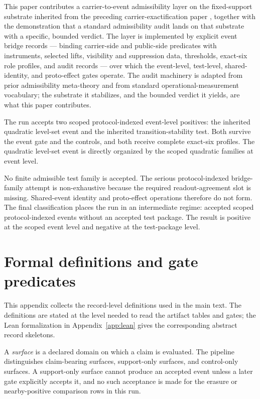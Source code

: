 \documentclass[11pt]{article}
\theoremstyle{definition}
\begin{document}
This paper contributes a carrier-to-event admissibility layer on the fixed-support substrate inherited from the preceding carrier-exactification paper \citep{Tsiokos2026CarrierExactification}, together with the demonstration that a standard admissibility audit lands on that substrate with a specific, bounded verdict. The layer is implemented by explicit event bridge records — binding carrier-side and public-side predicates with instruments, selected lifts, visibility and suppression data, thresholds, exact-six role profiles, and audit records — over which the event-level, test-level, shared-identity, and proto-effect gates operate. The audit machinery is adapted from prior admissibility meta-theory \citep{Tsiokos2026FoundationsII} and from standard operational-measurement vocabulary; the substrate it stabilizes, and the bounded verdict it yields, are what this paper contributes.

The run accepts two scoped protocol-indexed event-level positives: the inherited quadratic level-set event and the inherited transition-stability test. Both survive the event gate and the controls, and both receive complete exact-six profiles. The quadratic level-set event is directly organized by the scoped quadratic families at event level.

No finite admissible test family is accepted. The serious protocol-indexed bridge-family attempt is non-exhaustive because the required readout-agreement slot is missing. Shared-event identity and proto-effect operations therefore do not form. The final classification places the run in an intermediate regime: accepted scoped protocol-indexed events without an accepted test package. The result is positive at the scoped event level and negative at the test-package level.
 
\appendix
\section{Formal definitions and gate predicates}
\label{app:formal-definitions}

This appendix collects the record-level definitions used in the main text. The definitions are stated at the level needed to read the artifact tables and gates; the Lean formalization in Appendix~\ref{app:lean} gives the corresponding abstract record skeletons.

A \emph{surface} is a declared domain on which a claim is evaluated. The pipeline distinguishes claim-bearing surfaces, support-only surfaces, and control-only surfaces. A support-only surface cannot produce an accepted event unless a later gate explicitly accepts it, and no such acceptance is made for the erasure or nearby-positive comparison rows in this run.
\end{document}
